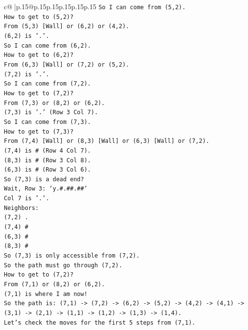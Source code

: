 \documentclass{article}
\begin{document}
{\begin{supertabular}{c@{$\;$}|p{.15\linewidth}@{}p{.15\linewidth}p{.15\linewidth}p{.15\linewidth}p{.15\linewidth}p{.15\linewidth}}
{{{\texttt{So I can come from (5,2).} \\
\texttt{How to get to (5,2)?} \\
\texttt{From (5,3) {[}Wall{]} or (6,2) or (4,2).} \\
\texttt{(6,2) is '.'.} \\
\texttt{So I can come from (6,2).} \\
\texttt{How to get to (6,2)?} \\
\texttt{From (6,3) {[}Wall{]} or (7,2) or (5,2).} \\
\texttt{(7,2) is '.'.} \\
\texttt{So I can come from (7,2).} \\
\texttt{How to get to (7,2)?} \\
\texttt{From (7,3) or (8,2) or (6,2).} \\
\texttt{(7,3) is '.' (Row 3 Col 7).} \\
\texttt{So I can come from (7,3).} \\
\texttt{How to get to (7,3)?} \\
\texttt{From (7,4) {[}Wall{]} or (8,3) {[}Wall{]} or (6,3) {[}Wall{]} or (7,2).} \\
\texttt{(7,4) is \# (Row 4 Col 7).} \\
\texttt{(8,3) is \# (Row 3 Col 8).} \\
\texttt{(6,3) is \# (Row 3 Col 6).} \\
\texttt{So (7,3) is a dead end?} \\
\texttt{Wait, Row 3: `y.\#.\#\#.\#\#`} \\
\texttt{Col 7 is '.'.} \\
\texttt{Neighbors:} \\
\texttt{(7,2) .} \\
\texttt{(7,4) \#} \\
\texttt{(6,3) \#} \\
\texttt{(8,3) \#} \\
\texttt{So (7,3) is only accessible from (7,2).} \\
\texttt{So the path must go through (7,2).} \\
\texttt{How to get to (7,2)?} \\
\texttt{From (7,1) or (8,2) or (6,2).} \\
\texttt{(7,1) is where I am now!} \\
\texttt{So the path is: (7,1) {-}> (7,2) {-}> (6,2) {-}> (5,2) {-}> (4,2) {-}> (4,1) {-}> (3,1) {-}> (2,1) {-}> (1,1) {-}> (1,2) {-}> (1,3) {-}> (1,4).} \\
\texttt{Let's check the moves for the first 5 steps from (7,1).} \\
}}}
\end{supertabular}}
\end{document}
